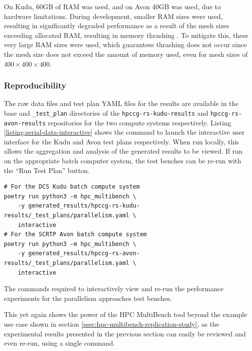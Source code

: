 On Kudu, 60GB of RAM was used, and on Avon 40GB was used, due to hardware limitations. During development, smaller RAM sizes were used, resulting in significantly degraded performance as a result of the mesh sizes exceeding allocated RAM, resulting in memory thrashing \cite{pattersonHennessyComputerOrganisationArchitecture}. To mitigate this, these very large RAM sizes were used, which guarantees thrashing does not occur since the mesh size does not exceed the amount of memory used, even for mesh sizes of $400 \times 400 \times 400$.


\subsubsection{Reproducibility}
\label{sssec:parallelism-approaches-reproducibility}

The raw data files and test plan YAML files for the results are available in the base and \texttt{\_test\_plan} directories of the \texttt{hpccg-rs-kudu-results} and \texttt{hpccg-rs-avon-results} repositories for the two compute systems respectively. Listing \ref{listing:serial-data-interactive} shows the command to launch the interactive user interface for the Kudu and Avon test plans respectively. When run locally, this allows the aggregation and analysis of the generated results to be viewed. If run on the appropriate batch computer system, the test benches can be re-run with the ``Run Test Plan'' button.

\begin{listing}[H]
    \begin{verbatim}
# For the DCS Kudu batch compute system
poetry run python3 -m hpc_multibench \
    -y generated_results/hpccg-rs-kudu-results/_test_plans/parallelism.yaml \
    interactive
# For the SCRTP Avon batch compute system
poetry run python3 -m hpc_multibench \
    -y generated_results/hpccg-rs-avon-results/_test_plans/parallelism.yaml \
    interactive
    \end{verbatim}
    \caption{The commands required to interactively view and re-run the performance experiments for the parallelism approaches test benches.}
    \label{listing:serial-data-interactive}
\end{listing}

This yet again shows the power of the HPC MultiBench tool beyond the example use case shown in section \ref{ssec:hpc-multibench-replication-study}, as the experimental results presented in the previous section can easily be reviewed and even re-run, using a single command.


